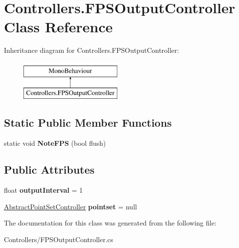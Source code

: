 \hypertarget{class_controllers_1_1_f_p_s_output_controller}{}\section{Controllers.\+F\+P\+S\+Output\+Controller Class Reference}
\label{class_controllers_1_1_f_p_s_output_controller}
Inheritance diagram for Controllers.\+F\+P\+S\+Output\+Controller\+:\begin{figure}[H]
\begin{center}
\leavevmode
\includegraphics[height=2.000000cm]{class_controllers_1_1_f_p_s_output_controller}
\end{center}
\end{figure}
\subsection*{Static Public Member Functions}
\begin{DoxyCompactItemize}
\item 
\mbox{\label{class_controllers_1_1_f_p_s_output_controller_a628a1c694c212ad4148aef85aa6a5634}} 
static void {\bfseries Note\+F\+PS} (bool flush)
\end{DoxyCompactItemize}
\subsection*{Public Attributes}
\begin{DoxyCompactItemize}
\item 
\mbox{\label{class_controllers_1_1_f_p_s_output_controller_ad70bd399d1f66b55969d7bd731647503}} 
float {\bfseries output\+Interval} = 1
\item 
\mbox{\label{class_controllers_1_1_f_p_s_output_controller_ae5e3b6dfd49f7fa25df8309a98980865}} 
\hyperlink{class_controllers_1_1_abstract_point_set_controller}{Abstract\+Point\+Set\+Controller} {\bfseries pointset} = null
\end{DoxyCompactItemize}


The documentation for this class was generated from the following file\+:\begin{DoxyCompactItemize}
\item 
Controllers/F\+P\+S\+Output\+Controller.\+cs\end{DoxyCompactItemize}
